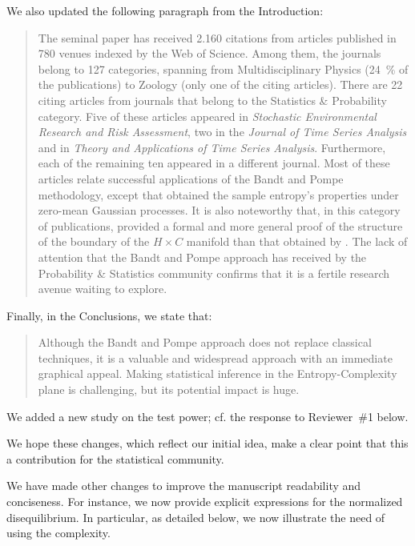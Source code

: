 \documentclass[alpha-refs]{wiley-article}
\begin{document}
We also updated the following paragraph from the Introduction:
\begin{quote}
The seminal paper has received \num{2,160} citations from articles published in \num{780} venues indexed by the Web of Science.
Among them, the journals belong to \num{127} categories, spanning from Multidisciplinary Physics (\SI{24}{\percent} of the publications) to Zoology (only one of the citing articles).
There are \num{22} citing articles from journals that belong to the Statistics \& Probability category.
Five of these articles appeared in \textit{Stochastic Environmental Research and Risk Assessment}, 
two in the \textit{Journal of Time Series Analysis} and in 
\textit{Theory and Applications of Time Series Analysis}.
Furthermore, each of the remaining ten appeared in a different journal.
Most of these articles relate successful applications of the Bandt and Pompe methodology, except \cite{OrdinalPatternProbabilities} that obtained the sample entropy's properties under zero-mean Gaussian processes.
It is also noteworthy that, in this category of publications, \cite{DistributionsofOrderPatternsofIntervalMaps} provided a formal and more general proof of the structure of the boundary of the $H\times C$ manifold than that obtained by \cite{martin2006generalized}.
The lack of attention that the Bandt and Pompe approach has received by the Probability \& Statistics community confirms that it is a fertile research avenue waiting to explore.
\end{quote}

Finally, in the Conclusions, we state that:
\begin{quote}
Although the Bandt and Pompe approach does not replace classical techniques, it is a valuable and widespread approach with an immediate graphical appeal.
Making statistical inference in the Entropy-Complexity plane is challenging, but its potential impact is huge.
\end{quote}

We added a new study on the test power; cf. the response to Reviewer~\#1 below.

We hope these changes, which reflect our initial idea, make a clear point that this a contribution for the statistical community.

We have made other changes to improve the manuscript readability and conciseness.
For instance, we now provide explicit expressions for the normalized disequilibrium.
In particular, as detailed below, we now illustrate the need of using the complexity.
\end{document}
